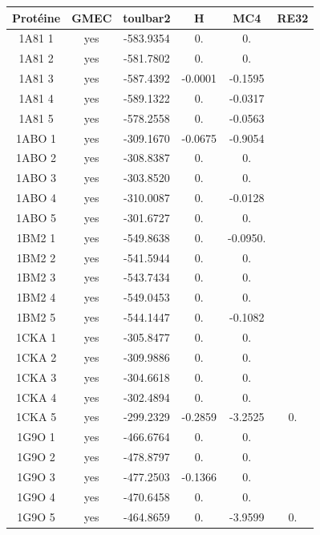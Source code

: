     \begin{table}[h]
      \centering

      \begin{tabular}{|c|c|c|c|c|c|}


        \hline
        Protéine & GMEC & toulbar2 & H & MC4 & RE32 \\
        \hline
        1A81 1 & yes & -583.9354 & 0. & 0. & \\
        1A81 2 & yes & -581.7802 & 0. & 0. & \\
        1A81 3 & yes & -587.4392 & -0.0001 & -0.1595 & \\
        1A81 4 & yes & -589.1322 & 0. & -0.0317 & \\
        1A81 5 & yes & -578.2558 & 0. & -0.0563 & \\
        1ABO 1 & yes & -309.1670 & -0.0675 & -0.9054 & \\
        1ABO 2 & yes & -308.8387 & 0. & 0. & \\
        1ABO 3 & yes & -303.8520 & 0. & 0. & \\
        1ABO 4 & yes & -310.0087 & 0. & -0.0128 & \\
        1ABO 5 & yes & -301.6727 & 0. & 0. & \\
        1BM2 1 & yes & -549.8638 & 0. & -0.0950. & \\
        1BM2 2 & yes & -541.5944 & 0. & 0. & \\
        1BM2 3 & yes & -543.7434 & 0. & 0. & \\
        1BM2 4 & yes & -549.0453 & 0. & 0. & \\
        1BM2 5 & yes & -544.1447 & 0. & -0.1082 & \\
        1CKA 1 & yes & -305.8477 & 0. & 0. & \\
        1CKA 2 & yes & -309.9886 & 0. & 0. & \\
        1CKA 3 & yes & -304.6618 & 0. & 0. & \\
        1CKA 4 & yes & -302.4894 & 0. & 0. & \\
        1CKA 5 & yes & -299.2329 & -0.2859 & -3.2525 & 0. \\
        1G9O 1 & yes & -466.6764 & 0. & 0. & \\
        1G9O 2 & yes & -478.8797 & 0. & 0. & \\
        1G9O 3 & yes & -477.2503 & -0.1366 & 0. & \\
        1G9O 4 & yes & -470.6458 & 0. & 0. & \\
        1G9O 5 & yes & -464.8659 & 0. & -3.9599 & 0.\\

\end{tabular}
\end{table}
